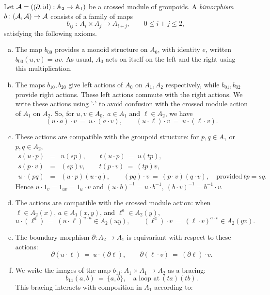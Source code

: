 Let $\mathcal{A} = ((\partial,\mathrm{id}) : \mathbb{A}_2 \to \mathbb{A}_1)$ 
be a crossed module of groupoids. 
A \emph{bimorphism} $b : (\mathcal{A},\mathcal{A}) \to \mathcal{A}$ consists of a family of maps 
$$
b_{ij} ~:~ A_i \times A_j \to A_{i+j}, \qquad 0 \leqslant i+j \leqslant 2, 
$$
satisfying the following axioms. 
\begin{enumerate}[(a)] 
\item
The map $b_{00}$ provides a monoid structure on $A_0$, with identity $e$, 
written $b_{00}(u,v) = uv$. 
As usual, $A_0$ acts on itself on the left and the right 
using this multiplication. 
\item
The maps $b_{10},b_{20}$ give left actions of $A_0$ on $A_1,A_2$ 
respectively, while $b_{01},b_{02}$ provide right actions. 
These left actions commute with the right actions. 
We write these actions using '$\cdot$' to avoid confusion 
with the crossed module action of $A_1$ on $A_2$. 
So, for $u,v \in A_0,~ a \in A_1$ and $\ell \in A_2$,  we have 
$$
(u \cdot a) \cdot v ~=~ u \cdot (a \cdot v), \qquad
(u \cdot \ell) \cdot v ~=~ u \cdot (\ell \cdot v).
$$
\item 
These actions are compatible with the groupoid structure: 
for $p,q \in A_1$ or $p,q \in A_2$,  
\begin{eqnarray*}
s(u \cdot p) &=& u(sp), \qquad t(u \cdot p) ~=~ u(tp), \\
s(p \cdot v) &=& (sp)v, \qquad t(p \cdot v) ~=~ (tp)v, \\
u \cdot (pq) &=& (u \cdot p)(u \cdot q), \qquad 
                 (pq) \cdot v ~=~ (p \cdot v)(q \cdot v), 
                 \quad\text{provided}~ tp = sq. 
\end{eqnarray*}
Hence $u \cdot 1_v = 1_{uv} = 1_u \cdot v$ and 
$(u \cdot b)^{-1} = u \cdot b^{-1},~ (b \cdot v)^{-1} = b^{-1} \cdot v$. 
\item
The actions are compatible with the crossed module action:  
when $\ell \in A_2(x)$, $a \in A_1(x,y)$, and $\ell^a \in A_2(y)$,  
$$
u \cdot (\ell^a) ~=~ (u \cdot \ell)^{u \cdot a} \in A_2(uy), \qquad 
(\ell^a) \cdot v ~=~ (\ell \cdot v)^{a \cdot v} \in A_2(yv). 
$$
\item 
The boundary morphism $\partial : A_2 \to A_1$ is equivariant 
with respect to these actions: 
$$
\partial(u \cdot \ell) ~=~ u \cdot (\partial\ell), \qquad 
\partial(\ell \cdot v) ~=~ (\partial\ell) \cdot v. 
$$
\item
We write the images of the map $b_{11} : A_1 \times A_1 \to A_2$ 
as a bracing: 
$$
b_{11}(a,b) ~=~ \{a,b\}, \quad\text{a loop at}~ (ta)(tb).
$$
This bracing interacts with composition in $A_1$ according to: 

\end{enumerate}

